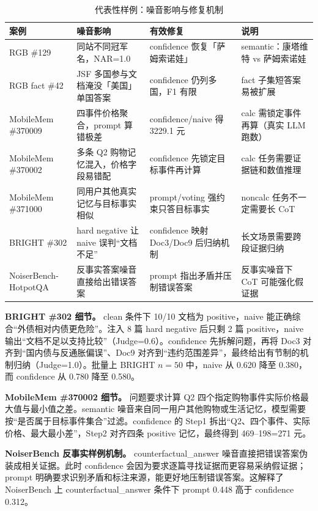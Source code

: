 \documentclass[UTF8,zihao=-4]{ctexart}
\begin{document}
\begin{table}[H]
  \centering
  \caption{代表性样例：噪音影响与修复机制}
  \label{tab:case_studies}
  \small
  \begin{tabularx}{\textwidth}{lYYY}
    \toprule
    案例 & 噪音影响 & 有效修复 & 说明 \\
    \midrule
    RGB \#129 & 同站不同冠军名，NAR=1.0 & confidence 恢复「萨姆索诺娃」 & semantic：康塔维特 vs 萨姆索诺娃 \\
    RGB fact \#42 & JSF 多国参与文档淹没「美国」单国答案 & confidence 仍列多国，F1 有限 & fact 子集短答案易被扩展 \\
    MobileMem \#370009 & 四事件价格聚合，prompt 算错极差 & confidence/naive 得 3229.1 元 & calc 需锁定事件再算（真实 LLM 跑数） \\
    MobileMem \#370002 & 多条 Q2 购物记忆混入，价格字段易错配 & confidence 先锁定目标事件再计算 & calc 任务需要证据链和数值推理 \\
    MobileMem \#371000 & 同用户其他真实记忆与目标事实相似 & prompt/voting 强约束只答目标事实 & noncalc 任务不一定需要长 CoT \\
    BRIGHT \#302 & hard negative 让 naive 误判“文档不足” & confidence 映射 Doc3/Doc9 后归纳机制 & 长文场景需要跨段证据归纳 \\
    NoiserBench-HotpotQA & 反事实答案噪音直接给出错误答案 & prompt 指出矛盾并压制错误答案 & 反事实噪音下 CoT 可能强化假证据 \\
    \bottomrule
  \end{tabularx}
\end{table}

\textbf{BRIGHT \#302 细节。} clean 条件下 10/10 文档为 positive，naive 能正确综合“外债相对内债更危险”。注入 8 篇 hard negative 后只剩 2 篇 positive，naive 输出“文档不足以支持比较”（Judge=0.6）。confidence 先拆解问题，再将 Doc3 对齐到“国内债与反通胀偏误”、Doc9 对齐到“违约范围差异”，最终给出有节制的机制归纳（Judge=1.0）。批量上 BRIGHT $n=50$ 中，naive 从 0.620 降至 0.380，而 confidence 从 0.780 降至 0.580。

\textbf{MobileMem \#370002 细节。} 问题要求计算 Q2 四个指定购物事件实际价格最大值与最小值之差。semantic 噪音来自同一用户其他购物或生活记忆，模型需要按“是否属于目标事件集合”过滤。confidence 的 Step1 拆出“Q2、四个事件、实际价格、最大最小差”，Step2 对齐四条 positive 记忆，最终得到 469--198=271 元。

\textbf{NoiserBench 反事实样例机制。} counterfactual\_answer 噪音直接把错误答案伪装成相关证据。此时 confidence 会因为要求逐篇寻找证据而更容易采纳假证据；prompt 明确要求识别矛盾和标注来源，能更好地压制错误答案。这解释了 NoiserBench 上 counterfactual\_answer 条件下 prompt 0.448 高于 confidence 0.312。
\end{document}
